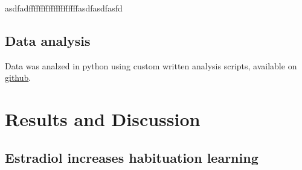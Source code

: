 \documentclass[9pt,lineno]{RandlettLab_elife}
\begin{document}
asdfadffffffffffffffffffffasdfasdfasfd

\subsection{Data analysis}

Data was analzed in python using custom written analysis scripts, available on \href{https://github.com/owenrandlett/2025\_HabEstrogen}{github}. 

\newpage
\section{Results and Discussion}

\subsection{Estradiol increases habituation learning}
\end{document}
